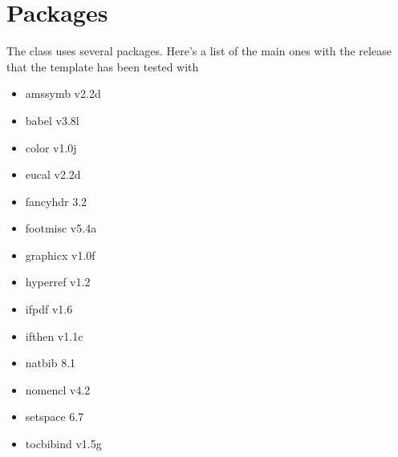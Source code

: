 \documentclass{article}
\begin{document}
\section{Packages}
The class uses several packages. Here's a list of the main ones with the release that the template has been tested with
\begin{itemize}
\item amssymb v2.2d
\item babel v3.8l
\item color v1.0j
\item eucal v2.2d
\item fancyhdr 3.2
\item footmisc v5.4a
\item graphicx v1.0f
\item hyperref v1.2
\item ifpdf v1.6
\item ifthen v1.1c
\item natbib 8.1
\item nomencl v4.2
\item setspace 6.7
\item tocbibind v1.5g
\end{itemize}
\end{document}
